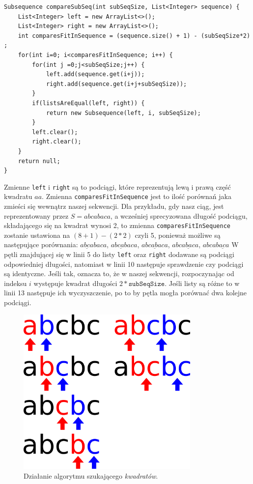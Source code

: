 \documentclass[document]{xmgr}
\begin{document}
\begin{lstlisting}[frame=single]
Subsequence compareSubSeq(int subSeqSize, List<Integer> sequence) {
	List<Integer> left = new ArrayList<>();
	List<Integer> right = new ArrayList<>();
	int comparesFitInSequence = (sequence.size() + 1) - (subSeqSize*2) ;
	for(int i=0; i<comparesFitInSequence; i++) {
		for(int j =0;j<subSeqSize;j++) {
			left.add(sequence.get(i+j));
			right.add(sequence.get(i+j+subSeqSize));
		}
		if(listsAreEqual(left, right)) {
			return new Subsequence(left, i, subSeqSize);
		}
		left.clear();
		right.clear();
	}
	return null;
}
\end{lstlisting}
Zmienne \texttt{left} i \texttt{right} są to podciągi, które reprezentują lewą i prawą część kwadratu $aa$. Zmienna \texttt{comparesFitInSequence} jest to ilość porównań jaka zmieści się wewnątrz naszej sekwencji. Dla przykładu, gdy nasz ciąg, jest reprezentowany przez $S = abcabaca$, a wcześniej sprecyzowana długość podciągu, składającego się na kwadrat wynosi 2, to zmienna \texttt{comparesFitInSequence} zostanie ustawiona na $(8 + 1) - (2 * 2)$ czyli 5, ponieważ możliwe są następujące porównania: $\underline{abca}baca$, $a\underline{bcab}aca$, $ab\underline{caba}ca$, $abc\underline{abac}a$, $abca\underline{baca}$
W pętli znajdującej się w linii 5 do listy \texttt{left} oraz \texttt{right} dodawane są podciągi odpowiedniej długości, natomiast w linii 10 następuje sprawdzenie czy podciągi są identyczne. Jeśli tak, oznacza to, że w naszej sekwencji, rozpoczynając od indeksu $i$ występuje kwadrat długości $2 * \texttt{subSeqSize}$. Jeśli listy są różne to w linii 13 następuje ich wyczyszczenie, po to by pętla mogła porównać dwa kolejne podciągi.

\begin{figure}[b]
    \centering
    \includegraphics[width = 0.8\textwidth]{images/squareFinding}
    \caption{Działanie algorytmu szukającego \emph{kwadratów}.}
    \label{fig:squareFinding}
\end{figure}
\end{document}
